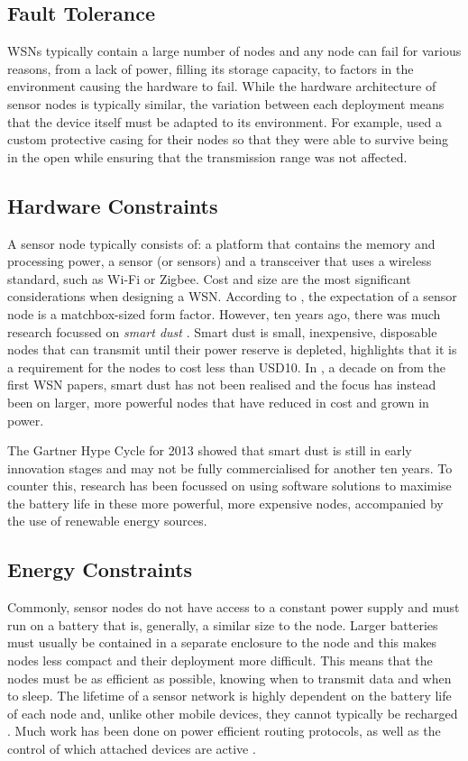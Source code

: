 \subsection{Fault Tolerance}
	WSNs typically contain a large number of nodes and any node can fail for various reasons, from a lack of power, filling its storage capacity, to factors in the environment causing the hardware to fail. While the hardware architecture of sensor nodes is typically similar, the variation between each deployment means that the device itself must be adapted to its environment. For example, \cite{Mainwaring2002} used a custom protective casing for their nodes so that they were able to survive being in the open while ensuring that the transmission range was not affected.


\subsection{Hardware Constraints}
	A sensor node typically consists of: a platform that contains the memory and processing power,  a sensor (or sensors) and a transceiver that uses a wireless standard, such as Wi-Fi or Zigbee. Cost and size are the most significant considerations when designing a WSN. According to \cite{Intanagonwiwat2000}, the expectation of a sensor node is a matchbox-sized form factor. However, ten years ago, there was much research focussed on \textit{smart dust} \cite{Kahn}. Smart dust is small, inexpensive, disposable nodes that can transmit until their power reserve is depleted, \cite{Akyildiz2002a} highlights that it is a requirement for the nodes to cost less than USD10. In \cite{Corke2010a}, a decade on from the first WSN papers, smart dust has not been realised and the focus has instead been on larger, more powerful nodes that have reduced in cost and grown in power. 

	The Gartner Hype Cycle for 2013 \cite{gartner2013} showed that smart dust is still in early innovation stages and may not be fully commercialised for another ten years. To counter this, research has been focussed on using software solutions to maximise the battery life in these more powerful, more expensive nodes, accompanied by the use of renewable energy sources.

\subsection{Energy Constraints}
	 Commonly, sensor nodes do not have access to a constant power supply and must run on a battery that is, generally, a similar size to the node. Larger batteries must usually be contained in a separate enclosure to the node and this makes nodes less compact and their deployment more difficult. This means that the nodes must be as efficient as possible, knowing when to transmit data and when to sleep. The lifetime of a sensor network is highly dependent on the battery life of each node and, unlike other mobile devices, they cannot typically be recharged \cite{Akyildiz2002}. Much work has been done on power efficient routing protocols, as well as the control of which attached devices are active \cite{Hempstead2005, Schurgers, Segal2010a}. 

